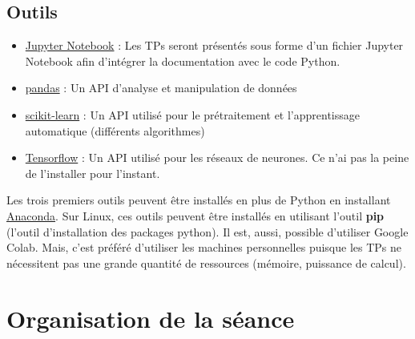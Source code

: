 \documentclass[11pt, a4paper]{article}
\begin{document}
\subsection{Outils}

\begin{itemize}
	\item \href{https://jupyter.org}{Jupyter Notebook} : Les TPs seront présentés sous forme d'un fichier Jupyter Notebook afin d'intégrer la documentation avec le code Python.
	\item \href{https://pandas.pydata.org/}{pandas} : Un API d'analyse et manipulation de données
	\item \href{https://scikit-learn.org/}{scikit-learn} : Un API utilisé pour le prétraitement et l'apprentissage automatique (différents algorithmes)
	\item \href{https://www.tensorflow.org/}{Tensorflow} : Un API utilisé pour les réseaux de neurones. Ce n'ai pas la peine de l'installer pour l'instant.
\end{itemize}

Les trois premiers outils peuvent être installés en plus de Python en installant \href{https://www.anaconda.com/products/individual#Downloads}{Anaconda}.
Sur Linux, ces outils peuvent être installés en utilisant l'outil \textbf{pip} (l'outil d'installation des packages python).
Il est, aussi, possible d'utiliser Google Colab. 
Mais, c'est préféré d'utiliser les machines personnelles puisque les TPs ne nécessitent pas une grande quantité de ressources (mémoire, puissance de calcul). 


\section{Organisation de la séance}
\end{document}
